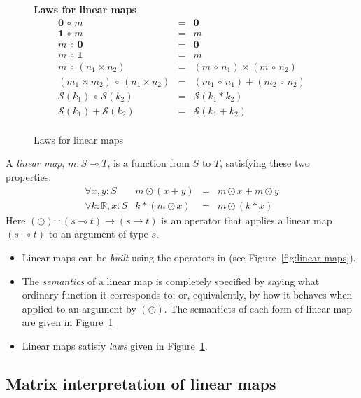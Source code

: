\documentclass[sigplan,review]{acmart}
\renewcommand{\to}{\rightarrow}    %
\newcommand{\linto}{\multimap}     %
\newcommand{\typ}[2]{#1 \! : \! #2}  %
\newcommand{\real}{\mathbb{R}}       %
\newcommand{\lmapply}{\odot}   %
\newcommand{\lmcomp}{\,\circ\,}   %
\newcommand{\lmpair}{\times}         %
\newcommand{\lmjoin}{\bowtie}        %
\newcommand{\lmzero}{\mathbf{0}}     %
\newcommand{\lmone}{\mathbf{1}}      %
\newcommand{\lmscalar}[1]{{\mathcal S}(#1)}      %
\begin{document}
\begin{figure}
{\begin{minipage}{\columnwidth}
  {\bf Laws for linear maps}
  $$
  \begin{array}{rcl}
    \lmzero \lmcomp m & = & \lmzero \\
    \lmone \lmcomp m & = & m \\
    m \lmcomp \lmzero & = & \lmzero \\
    m \lmcomp \lmone & = & m \\
    m \lmcomp (n_1 \lmjoin n_2) & = & (m \lmcomp n_1) \lmjoin (m \lmcomp n_2) \\
    (m_1 \lmjoin m_2) \lmcomp (n_1 \lmpair n_2) & = & (m_1 \lmcomp n_1) + (m_2 \lmcomp n_2) \\
    \lmscalar{k_1} \lmcomp \lmscalar{k_2} & = & \lmscalar{ k_1 * k_2 } \\
    \lmscalar{k_1} + \lmscalar{k_2} & = & \lmscalar{ k_1 + k_2 } \\
  \end{array}
  $$
    \end{minipage}
    }
    \caption{Laws for linear maps} \label{fig:lm-laws}
\end{figure}

A \emph{linear map}, $m : S \linto T$, is a function from $S$ to $T$,
satisfying these two properties:
$$
\begin{array}{rrcl}
  \forall \typ{x,y}{S} &  m \lmapply (x+y) & = & m \lmapply x + m \lmapply y \\
  \forall \typ{k}{\real}, \typ{x}{S} & k * (m \lmapply x) & = & m \lmapply (k * x)
\end{array}
$$
Here $(\lmapply) :: (s \linto t) \to (s \to t)$ is an operator that applies a linear map $(s \linto t)$
to an argument of type $s$.

\begin{itemize}
  \item Linear maps can be \emph{built} using the operators in (see Figure~\ref{fig:linear-maps}).
  \item The \emph{semantics} of a linear map is completely specified by saying
    what ordinary function it corresponds to; or, equivalently, by how it behaves when applied
    to an argument by $(\lmapply)$.  The semanticts of each form of linear map are given in Figure~\ref{fig:lm-laws}
  \item Linear maps satisfy \emph{laws} given in Figure~\ref{fig:lm-laws}.
\end{itemize}

\subsection{Matrix interpretation of linear maps}
\end{document}
